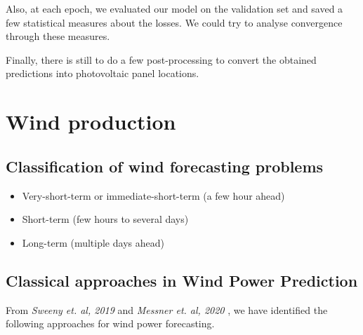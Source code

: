 \documentclass[a4paper, 12pt]{article}
\begin{document}
    Also, at each epoch, we evaluated our model on the validation set and saved a few statistical measures about the losses. We could try to analyse convergence through these measures.
    
    Finally, there is still to do a few post-processing to convert the obtained predictions into photovoltaic panel locations.
    
    \newpage
    
    \section{Wind production}

    \subsection{Classification of wind forecasting problems}
    
    \begin{itemize}
        \item Very-short-term or immediate-short-term (a few hour ahead)
        \item Short-term (few hours to several days)
        \item Long-term (multiple days ahead)
    \end{itemize}
    
    \subsection{Classical approaches in Wind Power Prediction}
    
    \label{subsec:classification}
    
    From \emph{Sweeny et. al, 2019} \cite{sweeney2019future} and \emph{Messner et. al, 2020} \cite{messner2020windpower}, we have identified the following approaches for wind power forecasting.
\end{document}
